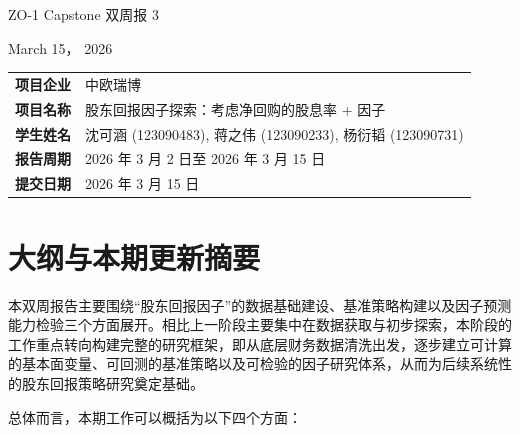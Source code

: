 \documentclass[a4paper,10pt]{article}
\begin{document}
\begin{center}
    \vspace*{1cm}
    {\Huge ZO-1 Capstone 双周报 3}
    
    \vspace{2.2cm}
    {\Large March 15， 2026}
    
    \vspace{1.2cm}
    \renewcommand{\arraystretch}{1.5}
    \begin{tabular}{@{} >{\bfseries}l l @{}}
        \toprule[1.5pt]
        项目企业 & 中欧瑞博 \\
        项目名称 & 股东回报因子探索：考虑净回购的股息率 + 因子 \\
        学生姓名 & 沈可涵 (123090483), 蒋之伟 (123090233), 杨衍韬 (123090731) \\
        报告周期 & 2026 年 3 月 2 日至 2026 年 3 月 15 日 \\
        提交日期 & 2026 年 3 月 15 日 \\
        \bottomrule[1.5pt]
    \end{tabular}
\end{center}

\newpage
\tableofcontents
\newpage


\section{大纲与本期更新摘要}

本双周报告主要围绕“股东回报因子”的数据基础建设、基准策略构建以及因子预测能力检验三个方面展开。相比上一阶段主要集中在数据获取与初步探索，本阶段的工作重点转向构建完整的研究框架，即从底层财务数据清洗出发，逐步建立可计算的基本面变量、可回测的基准策略以及可检验的因子研究体系，从而为后续系统性的股东回报策略研究奠定基础。

总体而言，本期工作可以概括为以下四个方面：
\end{document}
